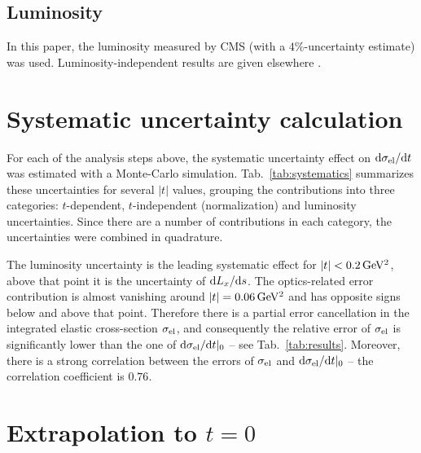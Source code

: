 \documentclass[doublecol]{epl/epl2}
\def\d{{\rm d}}
\def\un#1{\,{\rm #1}}
\begin{document}
\subsection{Luminosity}

In this paper, the luminosity measured by CMS (with a $4\%$-uncertainty estimate) was used.
Luminosity-independent results are given elsewhere \cite{P3}.



\section{Systematic uncertainty calculation}


For each of the analysis steps above, the systematic uncertainty effect on $\d\sigma_{\rm el}/\d t$ was estimated with a Monte-Carlo simulation. Tab.~\ref{tab:systematics} summarizes these uncertainties for several $|t|$ values, grouping the contributions into three categories: $t$-dependent, $t$-independent (normalization) and luminosity uncertainties. Since there are a number of contributions in each category, the uncertainties were combined in quadrature.

The luminosity uncertainty is the leading systematic effect for $|t| < 0.2\un{GeV^2}$, above that point it is the uncertainty of $\d L_x/\d s$. The optics-related error contribution is almost vanishing around $|t| = 0.06\un{GeV^2}$ and has opposite signs below and above that point. Therefore there is a partial error cancellation in the integrated elastic cross-section $\sigma_{\rm el}$, and consequently the relative error of $\sigma_{\rm el}$ is significantly lower than the one of $\d\sigma_{\rm el}/\d t|_0$ -- see Tab.~\ref{tab:results}. Moreover, there is a strong correlation between the errors of $\sigma_{\rm el}$ and $\d\sigma_{\rm el}/\d t|_0$ -- the correlation coefficient is $0.76$.



\section{Extrapolation to $t=0$}
\end{document}
